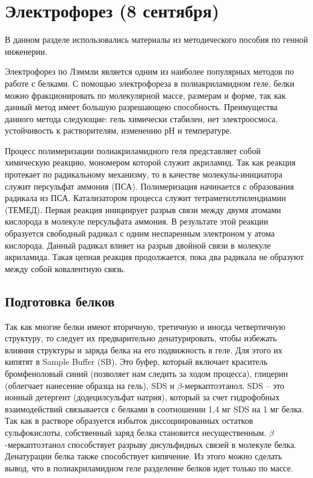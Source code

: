 \section{Электрофорез (8 сентября)}

В данном разделе использовались материалы из методического пособия по генной инженерии.

Электрофорез по Лэммли является одним из наиболее популярных методов по работе с белками. С
помощью электрофореза в полиакриламидном геле, белки можно фракционировать по молекулярной
массе, размерам и форме, так как данный метод имеет большую разрешающею способность. Преимущества
данного метода следующие: гель химически стабилен, нет электроосмоса, устойчивость к
растворителям, изменению рН и температуре.

Процесс полимеризации полиакриламидного геля представляет собой химическую реакцию,
мономером которой служит акриламид. Так как реакция протекает по радикальному механизму, то
в качестве молекулы-инициатора служит персульфат аммония (ПСА). Полимеризация начинается с
образования радикала из ПСА. Катализатором процесса служит тетраметилэтилендиамин (ТЕМЕД). Первая
реакция инициирует разрыв связи между двумя атомами кислорода в молекуле персульфата аммония. В
результате этой реакции образуется свободный радикал с одним неспаренным электроном у атома
кислорода. Данный радикал влияет на разрыв двойной связи в молекуле акриламида. Такая цепная
реакция продолжается, пока два радикала не образуют между собой ковалентную связь.

\subsection{Подготовка белков}

Так как многие белки имеют вторичную, третичную и иногда четвертичную структуру, то следует их
предварительно денатурировать, чтобы избежать влияния структуры и заряда белка на его
подвижность в геле. Для этого их кипятят в Sample Buffer (SB). Это буфер, который включает краситель
бромфеноловый синий (позволяет нам следить за ходом процесса), глицерин (облегчает нанесение
образца на гель), SDS и $\beta$-меркаптоэтанол. SDS -- это ионный детергент (додецилсульфат натрия), который
за счет гидрофобных взаимодействий связывается с белками в соотношении 1,4 мг SDS на 1 мг белка. Так
как в растворе образуется избыток диссоциированных остатков сульфокислоты, собственный заряд
белка становится несущественным. $\beta$-меркаптоэтанол способствует разрыву дисульфидных связей в
молекуле белка. Денатурации белка также способствует кипячение. Из этого можно сделать вывод, что
в полиакриламидном геле разделение белков идет только по массе.

